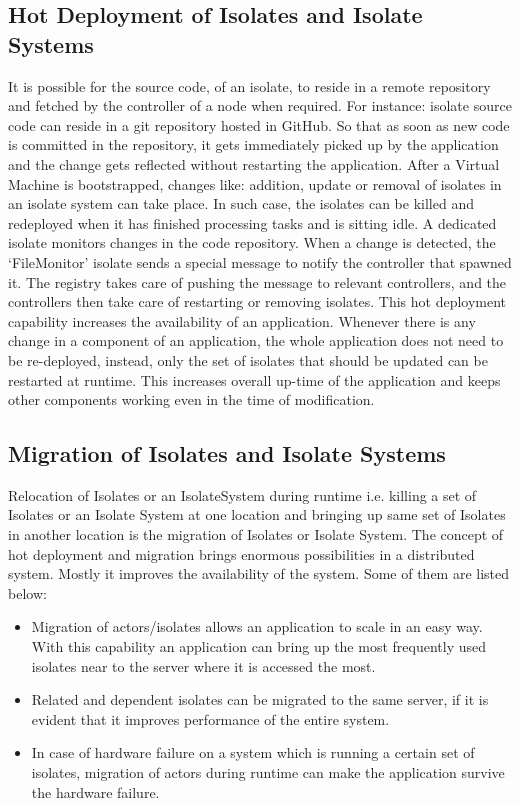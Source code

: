 \subsection{Hot Deployment of Isolates and Isolate Systems}
It is possible for the source code, of an isolate, to reside in a remote repository and fetched by the controller of a node when required. For instance: isolate source code can reside in a git repository hosted in GitHub. So that as soon as new code is committed in the repository, it gets immediately picked up by the application and the change gets reflected without restarting the application.
After a Virtual Machine is bootstrapped, changes like: addition, update or removal of isolates in an isolate system can take place. In such case, the isolates can be killed and redeployed when it has finished processing tasks and is sitting idle. A dedicated isolate monitors changes in the code repository. When a change is detected, the ‘FileMonitor’ isolate sends a special message to notify the controller that spawned it. The registry takes care of pushing the message to relevant controllers, and the controllers then take care of restarting or removing isolates.
This hot deployment capability increases the availability of an application. Whenever there is any change in a component of an application, the whole application does not need to be re-deployed, instead, only the set of isolates that should be updated can be restarted at runtime. This increases overall up-time of the application and keeps other components working even in the time of modification.

\subsection{Migration of Isolates and Isolate Systems}
Relocation of Isolates or an IsolateSystem during runtime i.e. killing a set of Isolates or an Isolate System at one location and bringing up same set of Isolates in another location is the migration of Isolates or Isolate System. The concept of hot deployment and migration brings enormous possibilities in a distributed system. Mostly it improves the availability of the system. Some of them are listed below:
\begin{itemize}
  \item Migration of actors/isolates allows an application to scale in an easy way. With this capability an application can bring up the most frequently used isolates near to the server where it is accessed the most.
  \item Related and dependent isolates can be migrated to the same server, if it is evident that it improves performance of the entire system.
  \item In case of hardware failure on a system which is running a certain set of isolates, migration of actors during runtime can make the application survive the hardware failure.

\end{itemize}
